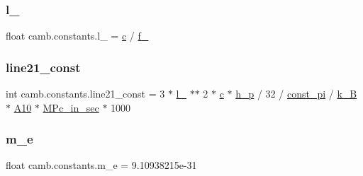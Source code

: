 \mbox{\label{namespacecamb_1_1constants_adcf680f76dae0255ef99d7e87b0bd1ef}} 
\subsubsection{\texorpdfstring{l\+\_\+21cm}{l\_21cm}}
{\footnotesize\ttfamily float camb.\+constants.\+l\+\_\+21cm = \mbox{\hyperlink{namespacecamb_1_1constants_a08e77640ea70d03f8c60ba9f7f2644b9}{c}} / \mbox{\hyperlink{namespacecamb_1_1constants_abcef79c675a2e21b9b2f0bf788033a54}{f\+\_\+21cm}}}

\mbox{\label{namespacecamb_1_1constants_ab069b8565e2e2a5d99450725ba2062b2}} 
\subsubsection{\texorpdfstring{line21\+\_\+const}{line21\_const}}
{\footnotesize\ttfamily int camb.\+constants.\+line21\+\_\+const = 3 $\ast$ \mbox{\hyperlink{namespacecamb_1_1constants_adcf680f76dae0255ef99d7e87b0bd1ef}{l\+\_\+21cm}} $\ast$$\ast$ 2 $\ast$ \mbox{\hyperlink{namespacecamb_1_1constants_a08e77640ea70d03f8c60ba9f7f2644b9}{c}} $\ast$ \mbox{\hyperlink{namespacecamb_1_1constants_ab268b921161c6a8a467bda8f21df3d17}{h\+\_\+p}} / 32 / \mbox{\hyperlink{namespacecamb_1_1constants_a1020ead9e0e4db6bc81ad82aa777cd28}{const\+\_\+pi}} / \mbox{\hyperlink{namespacecamb_1_1constants_af524d81ee3b1617ff9509b924eae87cd}{k\+\_\+B}} $\ast$ \mbox{\hyperlink{namespacecamb_1_1constants_a8b86eab84c8892fc5467fad7fc9445fb}{A10}} $\ast$ \mbox{\hyperlink{namespacecamb_1_1constants_a06b4573b5a8bbe0912b23507b6935679}{M\+Pc\+\_\+in\+\_\+sec}} $\ast$ 1000}

\mbox{\label{namespacecamb_1_1constants_a032e7b8bd00a45909d2e468080381ea1}} 
\subsubsection{\texorpdfstring{m\+\_\+e}{m\_e}}
{\footnotesize\ttfamily float camb.\+constants.\+m\+\_\+e = 9.\+10938215e-\/31}

